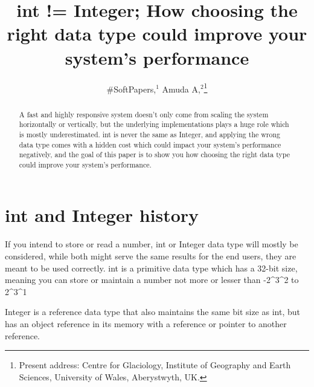 \documentclass[aog]{igs}
\begin{document}
\title[IGS \LaTeXe\ guide]{int != Integer; How choosing the right data type could improve your system's performance}

\author[Baxter and others]{#SoftPapers,$^1$
  Amuda A,$^2$\protect\thanks{Present address:
  Centre for Glaciology, Institute of Geography and
  Earth Sciences, University of Wales, Aberystwyth,
  UK.}}


\begin{frontmatter}

\maketitle

\begin{abstract}

A fast and highly responsive system doesn't only come from scaling the system horizontally or vertically, but the underlying implementations
plays a huge role which is mostly underestimated. int is never the same as Integer, and applying the wrong data type comes with a hidden cost which could impact your system's performance negatively, and the goal of this paper is to show you how choosing the right data type could improve your system's performance.
\end{abstract}

\end{frontmatter}


\section{int and Integer history}

If you intend to store or read a number, int or Integer data type will mostly be considered, while both might serve the same results for the end users,
they are meant to be used correctly. int is a primitive data type which has a 32-bit size, meaning you can store or maintain a number not more or lesser than -2^3^2 to  
  2^3^1

Integer is a reference data type that also maintains the same bit size as int, but has an object reference in its memory with a reference or
pointer to another reference.
\end{document}
